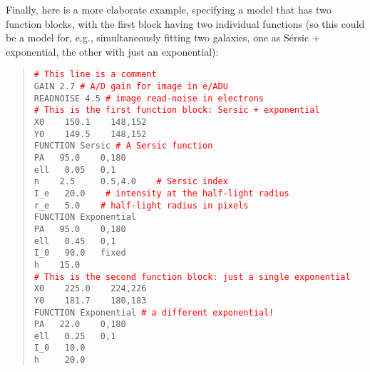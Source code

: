 \documentclass[10pt]{article}
\newcommand{\red}{\textcolor{red}}
\begin{document}
Finally, here is a more elaborate example, specifying a model that has
two function blocks, with the first block having two individual
functions (so this could be a model for, e.g., simultaneously fitting
two galaxies, one as S\'ersic + exponential, the other with just an
exponential):

\begin{quote}
  \texttt{\red{\# This line is a comment}}\\
  
  \texttt{GAIN  2.7   \red{\# A/D gain for image in e/ADU}}\\
  \texttt{READNOISE  4.5   \red{\# image read-noise in electrons}}\\
  
  \texttt{\red{\# This is the first function block: Sersic + exponential}}\\
  \texttt{X0 ~~   150.1  ~~ 148,152}\\
  \texttt{Y0 ~~   149.5  ~~ 148,152}\\
  \texttt{FUNCTION   Sersic   \red{\# A Sersic function}}\\
  \texttt{PA  ~  95.0  ~~ 0,180}\\
  \texttt{ell ~   0.05 ~ 0,1}\\
  \texttt{n   ~~   2.5  ~~~ 0.5,4.0 ~~ \red{\# Sersic index}}\\
  \texttt{I\_e ~  20.0 ~~ \red{\# intensity at the half-light radius}}\\
  \texttt{r\_e ~    5.0 ~~ \red{\# half-light radius in pixels}}\\
  \texttt{FUNCTION   Exponential}\\
  \texttt{PA   ~ 95.0  ~~ 0,180}\\
  \texttt{ell  ~  0.45  ~~0,1}\\
  \texttt{I\_0 ~  90.0  ~ fixed}\\
  \texttt{h    ~~ 15.0}\\
  
  \texttt{\red{\# This is the second function block: just a single exponential}}\\
  \texttt{X0 ~~   225.0  ~~ 224,226}\\
  \texttt{Y0 ~~   181.7  ~~ 180,183}\\
  \texttt{FUNCTION   Exponential   \red{\# a different exponential!}}\\
  \texttt{PA   ~ 22.0  ~~ 0,180      }\\
  \texttt{ell  ~  0.25 ~ 0,1}\\
  \texttt{I\_0 ~  10.0  }\\
  \texttt{h   ~~~  20.0}\\
\end{quote}
\end{document}

